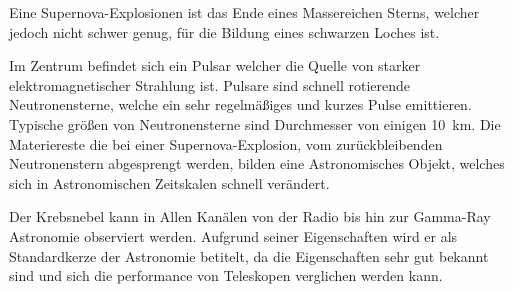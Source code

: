 Eine Supernova-Explosionen ist das Ende eines Massereichen Sterns, 
welcher jedoch nicht schwer genug,
für die Bildung eines schwarzen Loches ist.

Im Zentrum befindet sich ein Pulsar welcher die Quelle von starker
elektromagnetischer Strahlung ist.
Pulsare sind schnell rotierende Neutronensterne,
welche ein sehr regelmäßiges und kurzes Pulse emittieren.
Typische größen von Neutronensterne sind Durchmesser von einigen
\SI{10}{\kilo\meter}.
Die Materiereste die bei einer Supernova-Explosion,
vom zurückbleibenden Neutronenstern abgesprengt werden,
bilden eine Astronomisches Objekt,
welches sich in Astronomischen Zeitskalen schnell verändert.

Der Krebsnebel kann in Allen Kanälen von der Radio bis hin zur Gamma-Ray
Astronomie observiert werden.
Aufgrund seiner Eigenschaften wird er als Standardkerze der Astronomie betitelt,
da die Eigenschaften sehr gut bekannt sind und sich die performance von
Teleskopen verglichen werden kann. 
\clearpage
